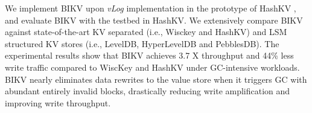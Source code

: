 \documentclass[sigconf]{acmart}
\begin{document}

We implement BIKV upon \textit{vLog} implementation in the prototype of HashKV \cite{HashKV}, and evaluate BIKV with the testbed in HashKV. We extensively compare BIKV against state-of-the-art KV separated (i.e., Wisckey and HashKV) and LSM structured KV stores (i.e., LevelDB, HyperLevelDB and PebblesDB). The experimental results show that BIKV achieves 3.7 X throughput and 44\% less write traffic compared to WiscKey and HashKV under GC-intensive workloads. BIKV nearly eliminates data rewrites to the value store when it triggers GC with abundant entirely invalid blocks, drastically reducing write amplification and improving write throughput.


\end{document}
